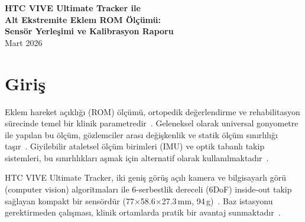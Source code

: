 \documentclass[11pt,a4paper]{article}
\begin{document}
\begin{center}
    {\LARGE\bfseries HTC VIVE Ultimate Tracker ile\\[4pt]
    Alt Ekstremite Eklem ROM \"Ol\c{c}\"um\"u:\\[4pt]
    Sens\"or Yerle\c{s}imi ve Kalibrasyon Raporu}\\[12pt]
    {\normalsize Mart 2026}
\end{center}

\vspace{6pt}

\begin{abstract}
Bu rapor, \"u\c{c} adet HTC VIVE Ultimate Tracker kullan{\i}larak sa\u{g} alt
ekstremitenin (kal\c{c}a ve diz eklemi) hareket a\c{c}{\i}kl{\i}\u{g}{\i}n{\i}n (ROM) ger\c{c}ek
zamanl{\i} \"ol\c{c}\"ulmesine y\"onelik bir sistemin sens\"or yerle\c{s}im kararlar{\i}n{\i},
kalibrasyon y\"ontemini ve tespit edilen yaz{\i}l{\i}m sorunlar{\i}n{\i}
sunmaktad{\i}r. Tracker'lar pelvis, femur ve tibia segmentlerine
ba\u{g}lanarak forward kinematics (FK) ile eklem a\c{c}{\i}lar{\i}
hesaplanmaktad{\i}r. Kalibrasyon, statik referans poz y\"ontemiyle
ger\c{c}ekle\c{s}tirilmi\c{s}tir. Test s\"urecinde iskelet hiyerar\c{s}isinden
kaynaklanan iki hata tespit edilmi\c{s} ve k\"ok neden analizi
yap{\i}lm{\i}\c{s}t{\i}r.
\end{abstract}

\tableofcontents
\vspace{8pt}

\section{Giri\c{s}}
\label{sec:giris}

Eklem hareket a\c{c}{\i}kl{\i}\u{g}{\i} (ROM) \"ol\c{c}\"um\"u, ortopedik de\u{g}erlendirme ve
rehabilitasyon s\"urecinde temel bir klinik parametredir~\cite{norkin2016}.
Geleneksel olarak universal gonyometre ile yap{\i}lan bu \"ol\c{c}\"um, g\"ozlemciler
aras{\i} de\u{g}i\c{s}kenlik ve statik \"ol\c{c}\"um s{\i}n{\i}rl{\i}l{\i}\u{g}{\i} ta\c{s}{\i}r~\cite{gajdosik1987}.
Giyilebilir ataletsel \"ol\c{c}\"um birimleri (IMU) ve optik tabanl{\i} takip
sistemleri, bu s{\i}n{\i}rl{\i}l{\i}klar{\i} a\c{s}mak i\c{c}in alternatif olarak
kullan{\i}lmaktad{\i}r~\cite{cuesta2010,seel2014}.

HTC VIVE Ultimate Tracker, iki geni\c{s} g\"or\"u\c{s} a\c{c}{\i}l{\i} kamera ve bilgisayarl{\i}
g\"or\"u (computer vision) algoritmalar{\i} ile 6-serbestlik dereceli (6DoF)
inside-out takip sa\u{g}layan kompakt bir sens\"ord\"ur
(77$\times$58.6$\times$27.3\,mm, 94\,g)~\cite{htcvive2024}. Baz istasyonu
gerektirmeden \c{c}al{\i}\c{s}mas{\i}, klinik ortamlarda pratik bir avantaj
sunmaktad{\i}r~\cite{niehorster2017}.
\end{document}
